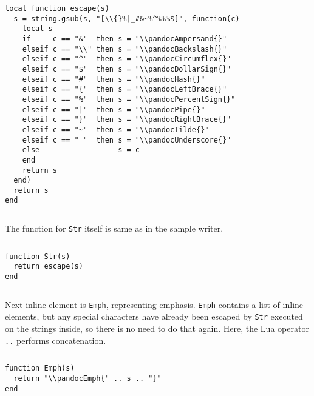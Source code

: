 \documentclass[
  digital,     %
  oneside,     %
  nosansbold,  %
  nocolorbold, %
  lof,         %
  lot,         %
]{fithesis4}
\begin{document}
$ $

\noindent
\lstset{language=[5.3]Lua}
\begin{lstlisting}
local function escape(s)
  s = string.gsub(s, "[\\{}%|_#&~%^%%%$]", function(c)
    local s
    if     c == "&"  then s = "\\pandocAmpersand{}"
    elseif c == "\\" then s = "\\pandocBackslash{}"
    elseif c == "^"  then s = "\\pandocCircumflex{}"
    elseif c == "$"  then s = "\\pandocDollarSign{}"
    elseif c == "#"  then s = "\\pandocHash{}"
    elseif c == "{"  then s = "\\pandocLeftBrace{}"
    elseif c == "%"  then s = "\\pandocPercentSign{}"
    elseif c == "|"  then s = "\\pandocPipe{}"
    elseif c == "}"  then s = "\\pandocRightBrace{}"
    elseif c == "~"  then s = "\\pandocTilde{}"
    elseif c == "_"  then s = "\\pandocUnderscore{}"
    else                  s = c
    end
    return s
  end)
  return s
end
\end{lstlisting}

$ $

\noindent
The function for \texttt{Str} itself is same as in the sample writer.

$ $

\noindent
\lstset{language=[5.3]Lua}
\begin{lstlisting}
function Str(s)
  return escape(s)
end
\end{lstlisting}

$ $

\noindent
Next inline element is \texttt{Emph}, representing emphasis. \texttt{Emph} contains a list of inline elements, but any special characters have already been escaped by \texttt{Str} executed on the strings inside, so there is no need to do that again. Here, the Lua operator \texttt{..} performs concatenation.

$ $

\noindent
\lstset{language=[5.3]Lua}
\begin{lstlisting}
function Emph(s)
  return "\\pandocEmph{" .. s .. "}"
end
\end{lstlisting}
\end{document}
